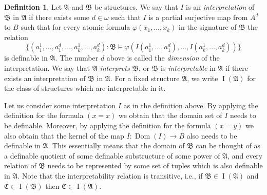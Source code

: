 \documentclass{amsart}
\theoremstyle{definition}
\newtheorem{definition}[theorem]{Definition}
\theoremstyle{remark}
\numberwithin{equation}{section}
\DeclareMathOperator{\I}{\operatorname{I}}
\newcommand{\dom}{\operatorname{Dom}}
\newcommand{\fa}{\mathfrak{A}}
\newcommand{\fb}{\mathfrak{B}}
\newcommand{\fc}{\mathfrak{C}}
\begin{document}
\begin{definition}
	Let $\fa$ and $\fb$ be structures. We say that $I$ is an \emph{interpretation} of $\fb$ in $\fa$ if there exists some $d\in \omega$ such that $I$ is a partial surjective map from $A^d$ to $B$ such that for every atomic formula $\varphi(x_1,\dots,x_k)$ in the signature of $\fb$ the relation
\[
\{(a_1^1,\dots,a_1^d,\dots,a_k^1,\dots,a_k^d): \fb\models \varphi(I(a_1^1,\dots,a_1^d),\dots,I(a_k^1,\dots,a_k^d))\}
\]
	is definable in $\fa$.
	The number $d$ above is called the \emph{dimension} of the interpretation.
	We say that $\fa$ \emph{interprets} $\fb$, or $\fb$ is \emph{interpretable} in $\fa$ if there exists an interpretation of $\fb$ in $\fa$. For a fixed structure $\fa$,
    we write $\I(\fa)$ for the class of structures which are interpretable in it.
\end{definition}


	Let us consider some interpretation $I$ as in the definition above. By applying the definition for the formula $(x=x)$ we obtain that the domain set of $I$ needs to be definable. Moreover, by applying the definition for the formula $(x=y)$ we also obtain that the kernel of the map $I \colon \dom(I)\rightarrow B$ also needs to be definable in $\fa$. This  essentially means that the domain of $\fb$ can be thought of as a definable quotient of some definable substructure of some power of $\fa$, and every relation of $\fb$ needs to be represented by some set of tuples which is also definable in $\fa$.
    Note that the interpretability relation is transitive, i.e., if $\fb\in \I(\fa)$ and $\fc\in \I(\fb)$ then $\fc\in \I(\fa)$.

	
\end{document}

